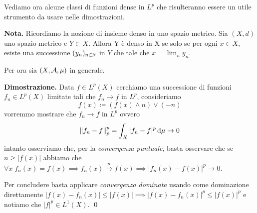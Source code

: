 Vediamo ora alcune classi di funzioni dense in $L^p$ che risulteranno essere un utile strumento da usare nelle dimostrazioni.

\textbf{Nota.} Ricordiamo la nozione di insieme denso in uno spazio metrico.
Sia $(X,d)$ uno spazio metrico e $Y \subset X$. Allora Y è denso in X se solo se
per ogni $x \in X$, esiste una successione $(y_n)_{n \in \mathbb N}$ in $Y$ che tale che $x = \lim_n y_n$.

Per ora sia $(X, \mathcal{A}, \mu)$ in generale.


\textbf{Dimostrazione.}
Data $f \in L^p(X)$ cerchiamo una successione di funzioni $f_n \in L^p(X)$ limitate tali che $f_n \to f$ in $L^p$, consideriamo
$$
	f(x) \coloneqq (f(x) \land n) \lor (-n)
$$
vorremmo mostrare che $f_n \to f$ in $L^p$ ovvero
$$
	\left\lVert f_n - f \right\rVert_p^p = \int_X |f_n - f|^p \,\mathrm{d} \mu \to 0
$$
intanto osserviamo che, per la \textit{convergenza puntuale}, basta osservare che se $n \geq |f(x)|$ abbiamo che $\forall x \; f_n(x) = f(x) \implies f_n(x) \xrightarrow{n} f(x) \implies |f_n(x) - f(x)|^p \to 0$.

Per concludere basta applicare \textit{convergenza dominata} usando come dominazione direttamente $|f(x) - f_n(x)| \leq |f(x)| \implies |f(x) - f_n(x)|^p \leq |f(x)|^p$ e notiamo che $|f|^p \in L^1(X)$.
\qed

\vs



